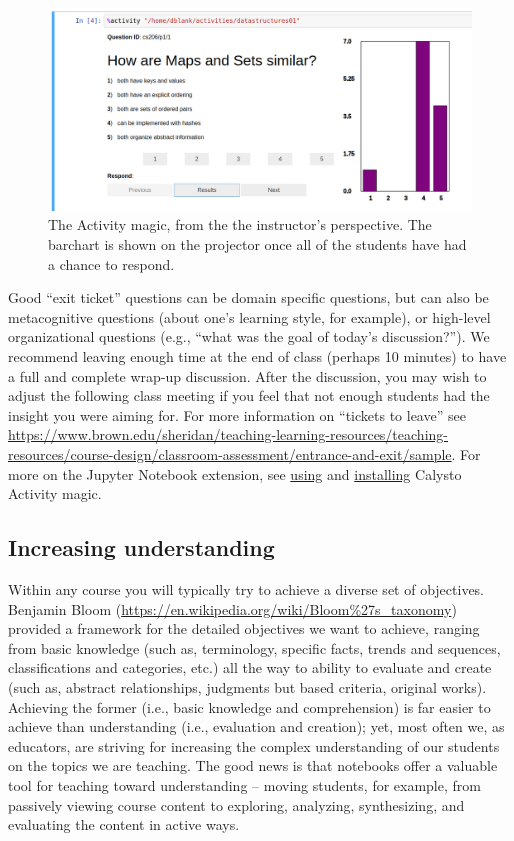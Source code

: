 \documentclass[]{book}
\begin{document}
\begin{figure}
\centering
\includegraphics{images/activity-magic-instructor.png}
\caption{The Activity magic, from the the instructor's perspective. The barchart is shown on the projector once all of the students have had a chance to respond.}
\end{figure}

Good ``exit ticket'' questions can be domain specific questions, but can also be
metacognitive questions (about one's learning style, for example), or high-level
organizational questions (e.g., ``what was the goal of today's discussion?''). We
recommend leaving enough time at the end of class (perhaps 10 minutes) to have a
full and complete wrap-up discussion. After the discussion, you may wish to
adjust the following class meeting if you feel that not enough students had the
insight you were aiming for. For more information on ``tickets to leave'' see
\url{https://www.brown.edu/sheridan/teaching-learning-resources/teaching-resources/course-design/classroom-assessment/entrance-and-exit/sample}.
For more on the Jupyter Notebook extension, see
\href{https://github.com/Calysto/metakernel/blob/master/metakernel/magics/README.md\#activity}{using}
and \href{https://github.com/Calysto/metakernel\#use-metakernel-magics-in-ipython}{installing}
Calysto Activity magic.

\hypertarget{increasing-understanding}{%
\subsection{Increasing understanding}\label{increasing-understanding}}

Within any course you will typically try to achieve a diverse set of objectives.
Benjamin Bloom (\url{https://en.wikipedia.org/wiki/Bloom\%27s_taxonomy}) provided a
framework for the detailed objectives we want to achieve, ranging from basic
knowledge (such as, terminology, specific facts, trends and sequences,
classifications and categories, etc.) all the way to ability to evaluate and
create (such as, abstract relationships, judgments but based criteria, original
works). Achieving the former (i.e., basic knowledge and comprehension) is far
easier to achieve than understanding (i.e., evaluation and creation); yet, most
often we, as educators, are striving for increasing the complex understanding of
our students on the topics we are teaching. The good news is that notebooks
offer a valuable tool for teaching toward understanding -- moving students, for
example, from passively viewing course content to exploring, analyzing,
synthesizing, and evaluating the content in active ways.
\end{document}

